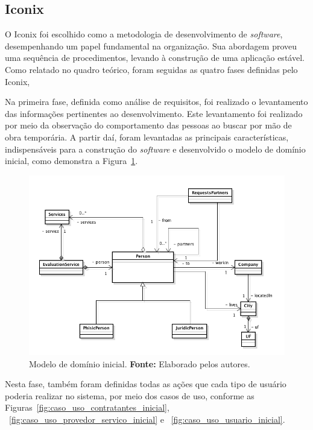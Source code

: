 \subsection{Iconix}

\par O Iconix foi escolhido como a metodologia de desenvolvimento de \textit{software}, desempenhando um papel fundamental na organização. Sua abordagem proveu uma sequência de procedimentos, levando à construção de uma aplicação estável. Como relatado no quadro teórico, foram seguidas as quatro fases definidas pelo Iconix,

\par Na primeira fase, definida como análise de requisitos, foi realizado o levantamento das informações pertinentes ao desenvolvimento. Este levantamento foi realizado por meio da observação do comportamento das pessoas ao buscar por mão de obra temporária. A partir daí, foram levantadas as principais características, indispensáveis para a construção do \textit{software} e desenvolvido o modelo de domínio inicial, como demonstra a Figura~\ref{fig:modelo_dominio_inicial}.

\begin{figure}[h!]
	\centerline{\includegraphics[scale=0.45]{./imagens/modelo-dominio-inicial.png}}
	\caption[Modelo de domínio inicial]
	{Modelo de domínio inicial. \textbf{Fonte:} Elaborado pelos autores.}
	\label{fig:modelo_dominio_inicial}
\end{figure}

\par Nesta fase, também foram definidas todas as ações que cada tipo de usuário poderia realizar no sistema, por meio dos casos de uso, conforme as Figuras~\ref{fig:caso_uso_contratantes_inicial}, ~\ref{fig:caso_uso_provedor_servico_inicial} e ~\ref{fig:caso_uso_usuario_inicial}.

